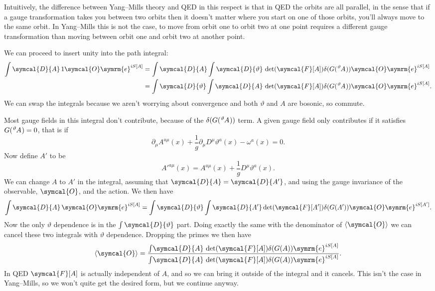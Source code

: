 \documentclass[fleqn]{NotesClass}
\newcommand{\e}{\symrm{e}}
\newcommand{\covariantDerivative}{D}
\newcommand{\DL}[1]{\symcal{D}{#1}}
\DeclarePairedDelimiter{\correlator}{\langle}{\rangle}
\begin{document}
    Intuitively, the difference between Yang--Mills theory and QED in this respect is that in QED the orbits are all parallel, in the sense that if a gauge transformation takes you between two orbits then it doesn't matter where you start on one of those orbits, you'll always move to the same orbit.
    In Yang--Mills this is not the case, to move from orbit one to orbit two at one point requires a different gauge transformation than moving between orbit one and orbit two at another point.
    
    We can proceed to insert unity into the path integral:
    \begin{align}
        \int \DL{A} \, 1 \symcal{O} \e^{iS[A]} &= \int \DL{A} \int \DL{\vartheta} \, \det(\symcal{F}[A]) \delta(G(\tensor[^\vartheta]{A}{})) \symcal{O} \e^{iS[A]}\\
        &= \int \DL{\vartheta} \int \DL{A} \, \det(\symcal{F}[A]) \delta(G(\tensor[^\vartheta]{A}{})) \symcal{O} \e^{iS[A]}.
    \end{align}
    We can swap the integrals because we aren't worrying about convergence and both \(\vartheta\) and \(A\) are bosonic, so commute.
    
    Most gauge fields in this integral don't contribute, because of the \(\delta(G(\tensor[^\vartheta]{A}{}))\) term.
    A given gauge field only contributes if it satisfies \(G(\tensor[^\vartheta]{A}{}) = 0\), that is if
    \begin{equation}
        \partial_\mu A^{a\mu}(x) + \frac{1}{g} \partial_\mu \covariantDerivative^\mu \vartheta^a(x) - \omega^a(x) = 0.
    \end{equation}
    Now define \(A'\) to be
    \begin{equation}
        A'^{a\mu}(x) = A^{a\mu}(x) + \frac{1}{g}\covariantDerivative^\mu \vartheta^a(x).
    \end{equation}
    We can change \(A\) to \(A'\) in the integral, assuming that \(\DL{A} = \DL{A'}\), and using the gauge invariance of the observable, \(\symcal{O}\), and the action.
    We then have
    \begin{equation}
        \int\DL{A} \, \symcal{O} \e^{iS[A]} = \int \DL{\vartheta} \int \DL{A'} \det(\symcal{F}[A']) \delta(G(A')) \symcal{O} \e^{iS[A']}.
    \end{equation}
    Now the only \(\vartheta\) dependence is in the \(\int\DL{\vartheta}\) part.
    Doing exactly the same with the denominator of \(\correlator{\symcal{O}}\) we can cancel these two integrals with \(\vartheta\) dependence.
    Dropping the primes we then have
    \begin{equation}
        \correlator{\symcal{O}} = \frac{\int \! \DL{A} \, \det(\symcal{F}[A]) \delta(G(A)) \e^{iS[A]}}{\int \! \DL{A} \, \det(\symcal{F}[A]) \delta(G(A)) \e^{iS[A]}}.
    \end{equation}
    In QED \(\symcal{F}[A]\) is actually independent of \(A\), and so we can bring it outside of the integral and it cancels.
    This isn't the case in Yang--Mills, so we won't quite get the desired form, but we continue anyway.
    
\end{document}
